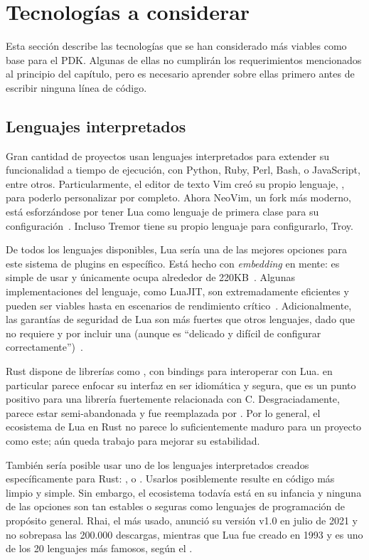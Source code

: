 \section{Tecnologías a considerar}

Esta sección describe las tecnologías que se han considerado más viables como
base para el PDK. Algunas de ellas no cumplirán los requerimientos mencionados
al principio del capítulo, pero es necesario aprender sobre ellas primero antes
de escribir ninguna línea de código.

\subsection{Lenguajes interpretados}

Gran cantidad de proyectos usan lenguajes interpretados para extender su
funcionalidad a tiempo de ejecución, con Python, Ruby, Perl, Bash, o JavaScript,
entre otros. Particularmente, el editor de texto Vim creó su propio lenguaje,
, para poderlo personalizar por completo. Ahora NeoVim, un
fork más moderno, está esforzándose por tener Lua como lenguaje de primera clase
para su configuración~\cite{nvimlua}. Incluso Tremor tiene su propio lenguaje
para configurarlo, Troy.

De todos los lenguajes disponibles, Lua sería una de las mejores opciones para
este sistema de plugins en específico. Está hecho con \emph{embedding} en mente:
es simple de usar y únicamente ocupa alrededor de
220KB~\cite{ierusalimschy2006programming}. Algunas implementaciones del
lenguaje, como LuaJIT, son extremadamente eficientes y pueden ser viables hasta
en escenarios de rendimiento crítico~\cite{luajitperf}. Adicionalmente, las
garantías de seguridad de Lua son más fuertes que otros lenguajes, dado que no
requiere \unsafe y por incluir una \sandbox (aunque es ``delicado y difícil de
configurar correctamente'')~\cite{luasandboxes}.

Rust dispone de librerías como , con bindings para interoperar
con Lua.  en particular parece enfocar su interfaz en ser idiomática
y segura, que es un punto positivo para una librería fuertemente relacionada con
C. Desgraciadamente, parece estar semi-abandonada y fue reemplazada por
. Por lo general, el ecosistema de Lua en Rust no parece lo
suficientemente maduro para un proyecto como este; aún queda trabajo para
mejorar su estabilidad.

También sería posible usar uno de los lenguajes interpretados creados
específicamente para Rust: ,  o .
Usarlos posiblemente resulte en código más limpio y simple. Sin embargo, el
ecosistema todavía está en su infancia y ninguna de las opciones son tan
estables o seguras como lenguajes de programación de propósito general. Rhai, el
más usado, anunció su versión v1.0 en julio de 2021 y no sobrepasa las 200.000
descargas, mientras que Lua fue creado en 1993 y es uno de los 20 lenguajes más
famosos, según el .

